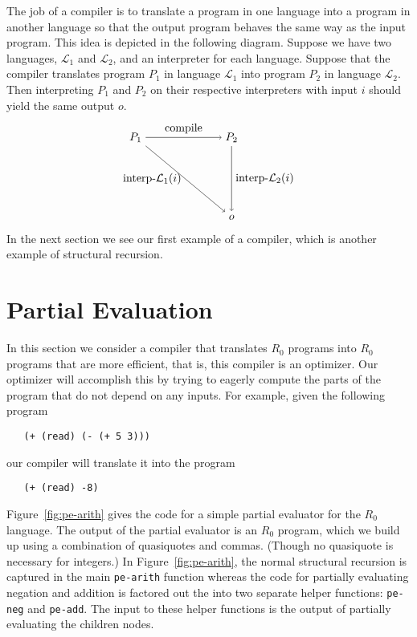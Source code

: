 \documentclass[11pt]{book}
\begin{document}
The job of a compiler is to translate a program in one language into a
program in another language so that the output program behaves the
same way as the input program. This idea is depicted in the following
diagram. Suppose we have two languages, $\mathcal{L}_1$ and
$\mathcal{L}_2$, and an interpreter for each language.  Suppose that
the compiler translates program $P_1$ in language $\mathcal{L}_1$ into
program $P_2$ in language $\mathcal{L}_2$.  Then interpreting $P_1$
and $P_2$ on their respective interpreters with input $i$ should yield
the same output $o$.
\begin{equation} \label{eq:compile-correct}
\begin{tikzpicture}[baseline=(current  bounding  box.center)]
 \node (p1) at (0,  0) {$P_1$};
 \node (p2) at (3,  0) {$P_2$};
 \node (o)  at (3, -2.5) {$o$};

 \path[->] (p1) edge [above] node {compile} (p2);
 \path[->] (p2) edge [right] node {interp-$\mathcal{L}_2$($i$)} (o);
 \path[->] (p1) edge [left]  node {interp-$\mathcal{L}_1$($i$)} (o);
\end{tikzpicture}
\end{equation}
In the next section we see our first example of a compiler, which is
another example of structural recursion.


\section{Partial Evaluation}
\label{sec:partial-evaluation}

In this section we consider a compiler that translates $R_0$
programs into $R_0$ programs that are more efficient, that is,
this compiler is an optimizer. Our optimizer will accomplish this by
trying to eagerly compute the parts of the program that do not depend
on any inputs. For example, given the following program
\begin{lstlisting}
   (+ (read) (- (+ 5 3)))
\end{lstlisting}
our compiler will translate it into the program
\begin{lstlisting}
   (+ (read) -8)
\end{lstlisting}

Figure~\ref{fig:pe-arith} gives the code for a simple partial
evaluator for the $R_0$ language. The output of the partial
evaluator is an $R_0$ program, which we build up using a
combination of quasiquotes and commas. (Though no quasiquote is
necessary for integers.) In Figure~\ref{fig:pe-arith}, the normal
structural recursion is captured in the main \texttt{pe-arith}
function whereas the code for partially evaluating negation and
addition is factored out the into two separate helper functions:
\texttt{pe-neg} and \texttt{pe-add}. The input to these helper
functions is the output of partially evaluating the children nodes.
\end{document}
